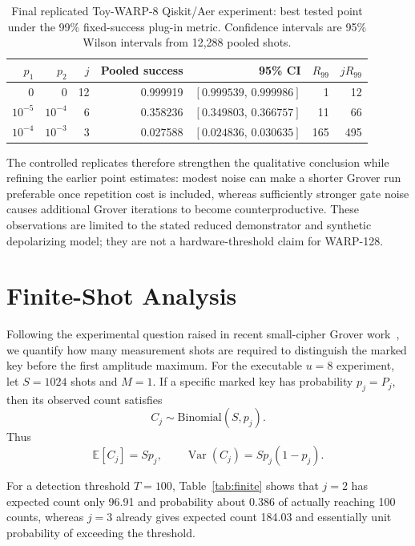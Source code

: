 \documentclass[pdflatex,sn-nature]{sn-jnl}
\newcommand{\E}{\mathbb{E}}
\theoremstyle{thmstyleone}
\theoremstyle{thmstyletwo}
\begin{document}
\begin{table}[htbp]
\centering
\caption{Final replicated Toy-WARP-8 Qiskit/Aer experiment: best tested point under the 99\% fixed-success plug-in metric. Confidence intervals are 95\% Wilson intervals from 12,288 pooled shots.}
\label{tab:toywarp_fixed_success}
\begin{tabular}{rrrrrrr}
\toprule
$p_1$ & $p_2$ & $j$ & Pooled success & 95\% CI & $R_{99}$ & $jR_{99}$\\
\midrule
0 & 0 & 12 & 0.999919 & $[0.999539,\,0.999986]$ & 1 & 12\\
$10^{-5}$ & $10^{-4}$ & 6 & 0.358236 & $[0.349803,\,0.366757]$ & 11 & 66\\
$10^{-4}$ & $10^{-3}$ & 3 & 0.027588 & $[0.024836,\,0.030635]$ & 165 & 495\\
\bottomrule
\end{tabular}
\end{table}

The controlled replicates therefore strengthen the qualitative conclusion while refining the earlier point estimates: modest noise can make a shorter Grover run preferable once repetition cost is included, whereas sufficiently stronger gate noise causes additional Grover iterations to become counterproductive. These observations are limited to the stated reduced demonstrator and synthetic depolarizing model; they are not a hardware-threshold claim for WARP-128.


\section{Finite-Shot Analysis}

Following the experimental question raised in recent small-cipher Grover work~\cite{Kiran2026}, we quantify how many measurement shots are required to distinguish the marked key before the first amplitude maximum. For the executable $u=8$ experiment, let $S=1024$ shots and $M=1$. If a specific marked key has probability $p_j=P_j$, then its observed count satisfies
\begin{equation}
    C_j\sim\mathrm{Binomial}(S,p_j).
\end{equation}
Thus
\begin{equation}
    \E[C_j]=Sp_j,\qquad \operatorname{Var}(C_j)=Sp_j(1-p_j).
\end{equation}

For a detection threshold $T=100$, Table~\ref{tab:finite} shows that $j=2$ has expected count only 96.91 and probability about 0.386 of actually reaching 100 counts, whereas $j=3$ already gives expected count 184.03 and essentially unit probability of exceeding the threshold.
\end{document}
